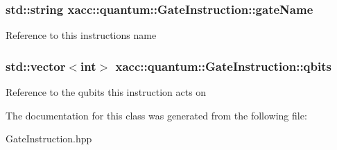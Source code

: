 \subsubsection[{\texorpdfstring{gate\+Name}{gateName}}]{\setlength{\rightskip}{0pt plus 5cm}std\+::string xacc\+::quantum\+::\+Gate\+Instruction\+::gate\+Name\hspace{0.3cm}{\ttfamily [protected]}}\hypertarget{a00033_a9961e6979139ced70300188cf2e4ad3f}{}\label{a00033_a9961e6979139ced70300188cf2e4ad3f}
Reference to this instructions name 
\subsubsection[{\texorpdfstring{qbits}{qbits}}]{\setlength{\rightskip}{0pt plus 5cm}std\+::vector$<$int$>$ xacc\+::quantum\+::\+Gate\+Instruction\+::qbits\hspace{0.3cm}{\ttfamily [protected]}}\hypertarget{a00033_a2a56be6c2519ea65df4d06f4abae1393}{}\label{a00033_a2a56be6c2519ea65df4d06f4abae1393}
Reference to the qubits this instruction acts on 

The documentation for this class was generated from the following file\+:\begin{DoxyCompactItemize}
\item 
Gate\+Instruction.\+hpp\end{DoxyCompactItemize}
